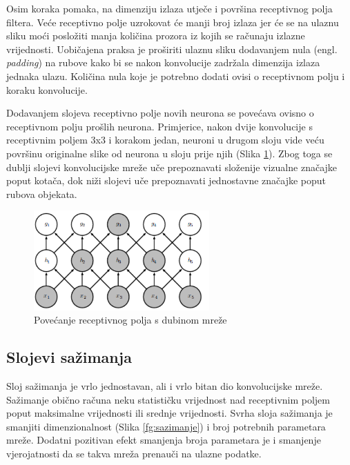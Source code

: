 \documentclass[times, utf8, proizvoljni, numeric]{fer}
\begin{document}
Osim koraka pomaka, na dimenziju izlaza utječe i površina receptivnog polja filtera. Veće receptivno polje uzrokovat će manji broj izlaza jer će se na ulaznu sliku moći posložiti manja količina prozora iz kojih se računaju izlazne vrijednosti. Uobičajena praksa je proširiti ulaznu sliku dodavanjem nula (engl. \textit{padding}) na rubove kako bi se nakon konvolucije zadržala dimenzija izlaza jednaka ulazu. Količina nula koje je potrebno dodati ovisi o receptivnom polju i koraku konvolucije.

Dodavanjem slojeva receptivno polje novih neurona se povećava ovisno o receptivnom polju prošlih neurona. Primjerice, nakon dvije konvolucije s receptivnim poljem 3x3 i korakom jedan, neuroni u drugom sloju vide veću površinu originalne slike od neurona u sloju prije njih (Slika \ref{fg:receptivno_polje}). Zbog toga se dublji slojevi konvolucijske mreže uče prepoznavati složenije vizualne značajke poput kotača, dok niži slojevi uče prepoznavati jednostavne značajke poput rubova objekata. 

\begin{figure}[!ht]
	\begin{center}
		\captionsetup{justification=centering}
		\includegraphics[width=0.6\textwidth]{./imgs/receptivno_polje.png}
		\caption{Povećanje receptivnog polja s dubinom mreže  \cite{deeplearningbook}}
		\label{fg:receptivno_polje}
	\end{center}
\end{figure}

\subsection{Slojevi sažimanja}

Sloj sažimanja je vrlo jednostavan, ali i vrlo bitan dio konvolucijske mreže. Sažimanje obično računa neku statističku vrijednost nad receptivnim poljem poput maksimalne vrijednosti ili srednje vrijednosti. Svrha sloja sažimanja je smanjiti dimenzionalnost (Slika \ref{fg:sazimanje}) i broj potrebnih parametara mreže. Dodatni pozitivan efekt smanjenja broja parametara je i smanjenje vjerojatnosti da se takva mreža prenauči na ulazne podatke.
\end{document}
